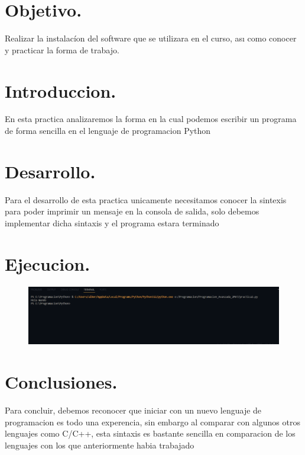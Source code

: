 \documentclass[10pt]{article}
\begin{document}
\newpage																		

\tableofcontents 

\newpage

\section{Objetivo.}

Realizar la instalacíon del software que se utilizara en el curso, ası como conocer y practicar la forma de trabajo.



\section{Introduccion.} 

En esta practica analizaremos la forma en la cual podemos escribir un programa de forma sencilla en el lenguaje de programacion Python

\section{Desarrollo.}
Para el desarrollo de esta practica unicamente necesitamos conocer la sintexis para poder imprimir un mensaje en la consola de salida, solo debemos implementar dicha sintaxis y el programa estara terminado


\section{Ejecucion.}

\begin{figure}[H]
	\begin{center}
 		\includegraphics[width = 1\textwidth]{ejecucion.png}
	\end{center} 
\end{figure}





\section{Conclusiones.}
Para concluir, debemos reconocer que iniciar con un nuevo lenguaje de programacion es todo una experencia, sin embargo al comparar con algunos otros lenguajes como C/C++, esta sintaxis es bastante sencilla en comparacion de los lenguajes con los que anteriormente habia trabajado
\
\end{document}
